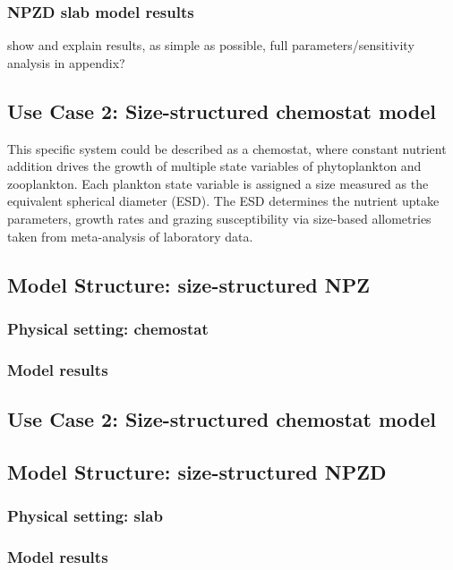 \documentclass[journal abbreviation, manuscript]{copernicus}
\begin{document}
\subsubsection{NPZD slab model results}
show and explain results, as simple as possible, full parameters/sensitivity analysis in appendix?


\subsection{Use Case 2: Size-structured chemostat model}

This specific system could be described as a chemostat, where constant nutrient addition drives the growth of multiple state variables of phytoplankton and zooplankton. Each plankton state variable is assigned a size measured as the equivalent spherical diameter (ESD). The ESD determines the nutrient uptake parameters, growth rates and grazing susceptibility via size-based allometries taken from meta-analysis of laboratory data.

\subsection{Model Structure: size-structured NPZ}

\subsubsection{Physical setting: chemostat}


\subsubsection{Model results}


\subsection{Use Case 2: Size-structured chemostat model}

\subsection{Model Structure: size-structured NPZD}



\subsubsection{Physical setting: slab}

\subsubsection{Model results}
\end{document}
